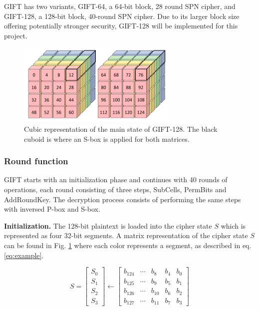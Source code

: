 \documentclass[conference]{IEEEtran}
\begin{document}
GIFT has two variants, GIFT-64, a 64-bit block, 28 round SPN cipher, and GIFT-128, a 128-bit block, 40-round SPN cipher. Due to its larger block size offering potentially stronger security, GIFT-128 will be implemented for this project\cite{adomnicai2020fixslicing}.

\begin{figure}
    \centering
    \includegraphics[width=0.8\columnwidth]{figures/GIFT01.png}
    \caption{Cubic representation of the main state of GIFT-128. The black cuboid is where an S-box is applied for both matrices\cite{adomnicai2020fixslicing}.}
    \label{fig:GIFT01}
\end{figure}

\subsubsection{Round function}

GIFT starts with an initialization phase and continues with 40 rounds of operations, each round consisting of three steps, SubCells, PermBits and AddRoundKey. The decryption process consists of performing the same steps with inversed P-box and S-box.

\textbf{Initialization.} The 128-bit plaintext is loaded into the cipher state $S$ which is represented as four 32-bit segments. A matrix representation of the cipher state $S$ can be found in Fig. \ref{fig:GIFT01} where each color represents a segment, as described in eq. \ref{eq:example}.

\begin{equation}
  S =
  \begin{bmatrix}
  S_0 \\
  S_1 \\
  S_2 \\
  S_3
  \end{bmatrix}
  \leftarrow
  \begin{bmatrix}
  b_{124} & \cdots & b_8 & b_4 & b_0 \\
  b_{125} & \cdots & b_9 & b_5 & b_1 \\
  b_{126} & \cdots & b_{10} & b_6 & b_2 \\
  b_{127} & \cdots & b_{11} & b_7 & b_3
  \end{bmatrix}
  \label{eq:example}
\end{equation}
\end{document}
